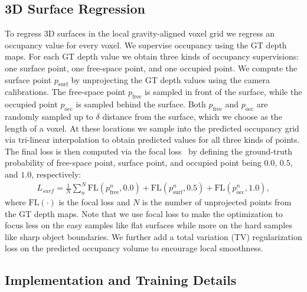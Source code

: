 \subsection{3D Surface Regression}
To regress 3D surfaces in the local gravity-aligned voxel grid we regress an occupancy value for every voxel. 
%
We supervise occupancy using the GT depth maps. For each GT depth value we obtain three kinds of occupancy supervisions: one surface point, one free-space point, and one occupied point. We compute the surface point $p_\text{surf}$ by unprojecting the GT depth values using the camera calibrations. The free-space point $p_\text{free}$ is sampled in front of the surface, while the occupied point $p_\text{occ}$ is sampled behind the surface. Both $p_\text{free}$ and $p_\text{occ}$ are randomly sampled up to $\delta$ distance from the surface, which we choose as the length of a voxel.
%
At these locations we sample into the predicted occupancy grid via tri-linear interpolation to obtain predicted values for all three kinds of points. The final loss is then computed via the focal loss~\cite{lin2017focal} by defining the ground-truth probability of free-space point, surface point, and occupied point being $0.0$, $0.5$, and $1.0$, respectively:
\begin{align}
   L_{surf} = \textstyle\frac{1}{N}\sum^{N}_{n} \text{FL}(p_\text{free}^n, 0.0) + \text{FL}(p_\text{surf}^n, 0.5) + \text{FL}(p_\text{occ}^n, 1.0),
\end{align}
where $\text{FL}(\cdot)$ is the focal loss and $N$ is the number of unprojected points from the GT depth maps. Note that we use focal loss to make the optimization to focus less on the easy samples like flat surfaces while more on the hard samples like sharp object boundaries. We further add a total variation (TV) regularization loss on the predicted occupancy volume to encourage local smoothness. 

\subsection{Implementation and Training Details}

